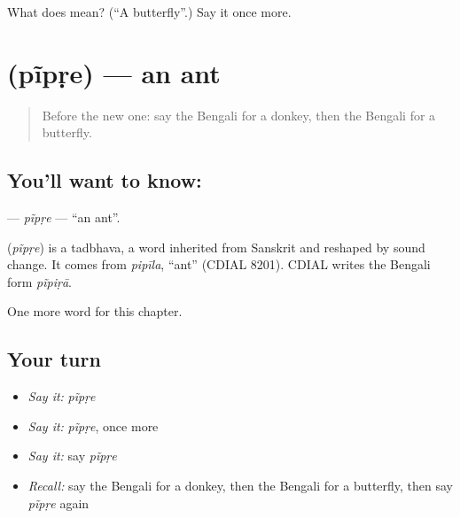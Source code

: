 \begin{tcolorbox}[breakable,colback=teal!4,colframe=teal!35!black,title={Before you move on}]
What does  mean? (\textquotedblleft{}A butterfly\textquotedblright{}.) Say it once more.
\end{tcolorbox}
\section[\texorpdfstring{\bn{পিঁপড়ে} (pĩpṛe)}{পিঁপড়ে (pĩpṛe)}]{ (pĩpṛe) — an ant}

\label{lesson:BN-C71-pipre}



\begin{quote}
Before the new one: say the Bengali for a donkey, then the Bengali for a butterfly.
\end{quote}

\subsection*{You'll want to know: }
\textbf{} — \emph{pĩpṛe} — \textquotedblleft{}an ant\textquotedblright{}.

\begin{cousinweb}
\textbf{} (\emph{pĩpṛe}) is a tadbhava, a word inherited from Sanskrit and reshaped by sound change. It comes from \emph{pipīla}, \textquotedblleft{}ant\textquotedblright{} (CDIAL 8201). CDIAL writes the Bengali form \emph{pĩpiṛā}.
\end{cousinweb}

\begin{grammarlens}[title={What you've built}]
One more word for this chapter.
\end{grammarlens}

\subsection*{Your turn}
\begin{itemize}
\raggedright
  \item \emph{Say it:} \emph{pĩpṛe}
  \item \emph{Say it:} \emph{pĩpṛe}, once more
  \item \emph{Say it:} say \emph{pĩpṛe}
  \item \emph{Recall:} say the Bengali for a donkey, then the Bengali for a butterfly, then say \emph{pĩpṛe} again
\end{itemize}

